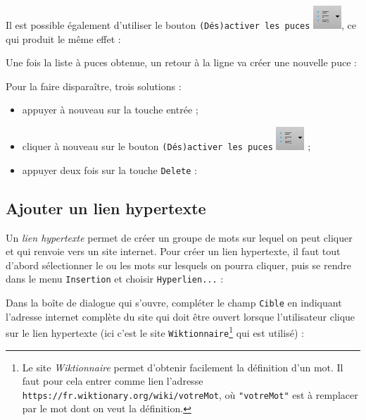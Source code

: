
Il est possible également d'utiliser le bouton \texttt{(Dés)activer les puces} \includegraphics[width=.6cm]{./images/texte02/listePucesIcone}, ce qui produit le même effet :


Une fois la liste à puces obtenue, un retour à la ligne va créer une nouvelle puce :


Pour la faire disparaître, trois solutions :
\begin{itemize}
\item appuyer à nouveau sur la touche entrée ;
\item cliquer à nouveau sur le bouton \texttt{(Dés)activer les puces} \includegraphics[width=.6cm]{./images/texte02/listePucesIcone} ;
\item appuyer deux fois sur la touche \texttt{Delete} :

\end{itemize}






\subsection{Ajouter un lien hypertexte}\label{Texte2LienHyper}

Un \emph{lien hypertexte} permet de créer un groupe de mots sur lequel on peut cliquer et qui renvoie vers un site internet. Pour créer un lien hypertexte, il faut tout d'abord sélectionner le ou les mots sur lesquels on pourra cliquer, puis se rendre dans le menu \texttt{Insertion} et choisir \texttt{Hyperlien...} :    


Dans la boîte de dialogue qui s'ouvre, compléter le champ \texttt{Cible} en indiquant l'adresse internet complète du site qui doit être ouvert lorsque l'utilisateur clique sur le lien hypertexte (ici c'est le site \texttt{Wiktionnaire}\footnote{Le site \emph{Wiktionnaire} permet d'obtenir facilement la définition d'un mot. Il faut pour cela entrer comme lien l'adresse \texttt{https://fr.wiktionary.org/wiki/votreMot}, où \texttt{"votreMot"} est à remplacer par le mot dont on veut la définition.} qui est utilisé) :   

